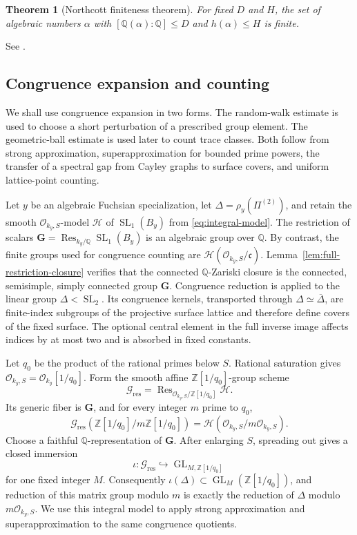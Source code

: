 \documentclass[11pt,reqno]{amsart}
\newtheorem{theorem}{Theorem}[section]
\theoremstyle{definition}
\theoremstyle{remark}
\newcommand{\Q}{\mathbb Q}
\newcommand{\Z}{\mathbb Z}
\newcommand{\cO}{\mathcal O}
\newcommand{\GL}{\operatorname{GL}}
\newcommand{\SL}{\operatorname{SL}}
\newcommand{\Res}{\operatorname{Res}}
\begin{document}
\begin{theorem}[Northcott finiteness theorem]
\label{input:northcott}
For fixed \(D\) and \(H\), the set of algebraic numbers \(\alpha\) with
\([\Q(\alpha):\Q]\le D\) and \(h(\alpha)\le H\) is finite.
\end{theorem}

See \cite[Theorem~1.6.8]{BombieriGubler}.

\subsection{Congruence expansion and counting}

We shall use congruence expansion in two forms.  The random-walk estimate is
used to choose a short perturbation of a prescribed group element.  The
geometric-ball estimate is used later to count trace classes.  Both follow
from strong approximation, superapproximation for bounded prime powers,
the transfer of a spectral gap from Cayley graphs to surface covers, and
uniform lattice-point counting.

Let \(y\) be an algebraic Fuchsian specialization, let
\(\Delta=\rho_y(\Pi^{(2)})\), and retain the smooth
\(\cO_{k_y,S}\)-model \(\mathcal H\) of \(\SL_1(B_y)\) from
\eqref{eq:integral-model}.  The restriction of scalars
\(\mathbf G=\Res_{k_y/\Q}\SL_1(B_y)\) is an algebraic group over \(\Q\).
By contrast, the finite groups used for congruence counting are
\(\mathcal H(\cO_{k_y,S}/\mathfrak c)\).
Lemma~\ref{lem:full-restriction-closure} verifies that the
connected \(\Q\)-Zariski closure is the connected, semisimple, simply
connected group \(\mathbf G\).  Congruence reduction is applied to the
linear group \(\Delta<\SL_2\).  Its congruence kernels, transported through
\(\Delta\simeq\overline\Delta\), are finite-index subgroups of the
projective surface lattice and therefore define covers of the fixed surface.
The optional central element in the full inverse image affects indices by at
most two and is absorbed in fixed constants.

Let \(q_0\) be the product of the rational primes below \(S\).  Rational
saturation gives \(\cO_{k_y,S}=\cO_{k_y}[1/q_0]\).  Form the smooth affine
\(\Z[1/q_0]\)-group scheme
\[
 \mathcal G_{\mathrm{res}}=
 \Res_{\cO_{k_y,S}/\Z[1/q_0]}\mathcal H.
\]
Its generic fiber is \(\mathbf G\), and for every integer \(m\) prime to
\(q_0\),
\[
 \mathcal G_{\mathrm{res}}(\Z[1/q_0]/m\Z[1/q_0])
 =\mathcal H(\cO_{k_y,S}/m\cO_{k_y,S}).
\]
Choose a faithful \(\Q\)-representation of \(\mathbf G\).  After enlarging
\(S\), spreading out gives a closed immersion
\[
 \iota:\mathcal G_{\mathrm{res}}\hookrightarrow\GL_{M,\Z[1/q_0]}
\]
for one fixed integer \(M\).  Consequently
\(\iota(\Delta)\subset\GL_M(\Z[1/q_0])\), and reduction of this matrix
group modulo \(m\) is exactly the reduction of \(\Delta\) modulo
\(m\cO_{k_y,S}\).  We use this integral model to apply strong
approximation and superapproximation to the same congruence quotients.
\end{document}
